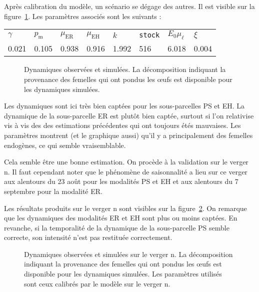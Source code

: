 Après calibration du modèle, un scénario se dégage des autres.
Il est visible sur la figure~\ref{fig:D}.
Les paramètres associés sont les suivants :
\begin{center}
\begin{tabular}{llllllll}
$\gamma$ & $p_{\text{m}}$ & $\mu_{\text{ER}}$ & $\mu_{\text{EH}}$ & $k$ & \texttt{stock} & $E_0\mu_{\ell}$ & $\xi$\\
0.021 & 0.105 & 0.938 & 0.916 & 1.992 & 516 & 6.018 & 0.004
\end{tabular}
\end{center}


\begin{figure}[ht]
 \centering
 \caption{Dynamiques observées et simulées. La décomposition indiquant la provenance des femelles qui ont pondus les œufs est disponible pour les dynamiques simulées.}
 \label{fig:D}
\end{figure}


Les dynamiques sont ici très bien captées pour les sous-parcelles PS et EH.
La dynamique de la sous-parcelle ER est plutôt bien captée, surtout si l'on relativise vis à vis des des estimations précédentes qui ont toujours étés mauvaises.
Les paramètres montrent (et le graphique aussi) qu'il y a principalement des femelles endogènes, ce qui semble vraisemblable.



Cela semble être une bonne estimation.
On procède à la validation sur le verger n.
Il faut cependant noter que le phénomène de saisonnalité a lieu sur ce verger aux alentours du 23 août pour les modalités PS et EH et aux alentours du 7 septembre pour la modalité ER.

Les résultats produits sur le verger n sont visibles sur la figure~\ref{fig:D2}.
On remarque que les dynamiques des modalités ER et EH sont plus ou moins captées.
En revanche, si la temporalité de la dynamique de la sous-parcelle PS semble correcte, son intensité n'est pas restituée correctement.
\begin{figure}[ht]
 \centering
 \caption{Dynamiques observées et simulées sur le verger n. La décomposition indiquant la provenance des femelles qui ont pondus les œufs est disponible pour les dynamiques simulées.
 Les paramètres utilisés sont ceux calibrés par le modèle sur le verger n.}
 \label{fig:D2}
\end{figure}











